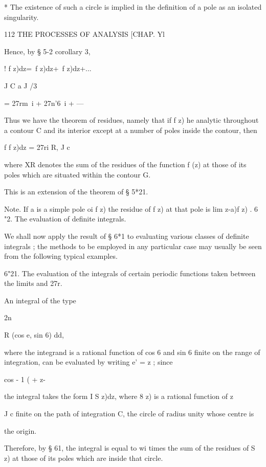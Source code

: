 * The existence of such a circle is implied in the definition of a
pole as an isolated singularity.



112 THE PROCESSES OF ANALYSIS [CHAP. Yl

Hence, by § 5-2 corollary 3,

! f z)dz=\ f z)dz+\ f z)dz+...

J C a J /3

= 27rm\ i + 27n'6\ i + —

Thus we have the theorem of residues, namely that if f z) he analytic
throughout a contour C and its interior except at a number of poles
inside the contour, then

f f z)dz = 27ri R, J c

where XR denotes the sum of the residues of the function f (z) at
those of its poles which are situated within the contour G.

This is an extension of the theorem of § 5*21.

Note. If a is a simple pole oi f z) the residue of f z) at that pole
is lim z-a)f z) . 6 "2. The evaluation of definite integrals.

We shall now apply the result of § 6*1 to evaluating various classes
of definite integrals ; the methods to be employed in any particular
case may usually be seen from the following typical examples.

6"21. The evaluation of the integrals of certain periodic functions
taken between the limits and 27r.



An integral of the type



2n



R (cos e, sin 6) dd,



where the integrand is a rational function of cos 6 and sin 6 finite
on the range of integration, can be evaluated by writing e' = z ;
since

cos - 1 ( + z-%

the integral takes the form I S z)dz, where 8 z) is a rational
function of z

J c finite on the path of integration C, the circle of radius unity
whose centre is

the origin.

Therefore, by § 61, the integral is equal to wi times the sum of the
residues of S z) at those of its poles which are inside that circle.

